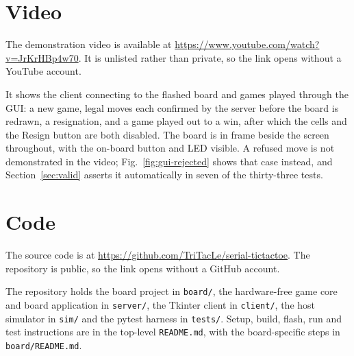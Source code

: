 \section{Video}
\label{sec:video}

The demonstration video is available at
\url{https://www.youtube.com/watch?v=JrKrHBp4w70}. It is unlisted rather than
private, so the link opens without a YouTube account.

It shows the client connecting to the flashed board and games played through
the GUI: a new game, legal moves each confirmed by the server before the board
is redrawn, a resignation, and a game played out to a win, after which the
cells and the Resign button are both disabled. The board is in frame beside the
screen throughout, with the on-board button and LED visible. A refused move is
not demonstrated in the video; Fig.~\ref{fig:gui-rejected} shows that case
instead, and Section~\ref{sec:valid} asserts it automatically in seven of the
thirty-three tests.

\section{Code}
\label{sec:code}

The source code is at \url{https://github.com/TriTacLe/serial-tictactoe}. The
repository is public, so the link opens without a GitHub account.

The repository holds the board project in \texttt{board/}, the hardware-free
game core and board application in \texttt{server/}, the Tkinter client in
\texttt{client/}, the host simulator in \texttt{sim/} and the pytest harness in
\texttt{tests/}. Setup, build, flash, run and test instructions are in the
top-level \texttt{README.md}, with the board-specific steps in
\texttt{board/README.md}.
